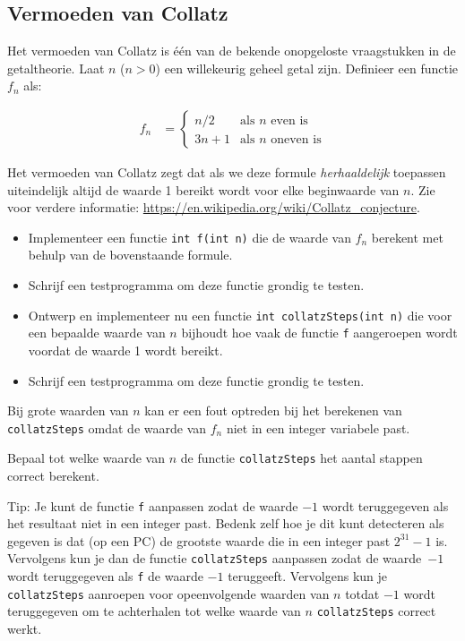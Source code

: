 \documentclass[a4paper,10pt,fleqn,twoside]{article}
\begin{document}
\subsection{Vermoeden van Collatz}
Het vermoeden van Collatz is één van de bekende onopgeloste vraagstukken in de getaltheorie.
Laat $n$ ($n>0$) een willekeurig geheel getal zijn. Definieer een functie $f_n$ als:

\begin{align*}
f_n &= \begin{cases}
n/2 &\text{als } n \text{ even is} \\
3n+1 &\text{als } n \text{ oneven is}
\end{cases}
\end{align*}

Het vermoeden van Collatz zegt dat als we deze formule \textsl{herhaaldelijk} toepassen uiteindelijk altijd de waarde 1 bereikt wordt voor elke beginwaarde van $n$. Zie voor verdere informatie: \url{https://en.wikipedia.org/wiki/Collatz_conjecture}. 

\begin{itemize}
\item Implementeer een functie \lstinline|int f(int n)| die de waarde van $f_n$ berekent met behulp van de bovenstaande formule.
\item Schrijf een testprogramma om deze functie grondig te testen.
\item Ontwerp en implementeer nu een functie \lstinline|int collatzSteps(int n)| die voor een bepaalde waarde van $n$ bijhoudt hoe vaak de functie \lstinline|f| aangeroepen wordt voordat de waarde 1 wordt bereikt.
\item Schrijf een testprogramma om deze functie grondig te testen.
\end{itemize}

Bij grote waarden van $n$ kan er een fout optreden bij het berekenen van \lstinline|collatzSteps| omdat de waarde van $f_n$ niet in een integer variabele past. 

Bepaal tot welke waarde van $n$ de functie \lstinline|collatzSteps| het aantal stappen correct berekent.

Tip: Je kunt de functie \lstinline|f| aanpassen zodat de waarde $-1$ wordt teruggegeven als het resultaat niet in een integer past. Bedenk zelf hoe je dit kunt detecteren als gegeven is dat (op een PC) de grootste waarde die in een integer past $2^{31}-1$ is. Vervolgens kun je dan de functie \lstinline|collatzSteps| aanpassen zodat de waarde~$-1$ wordt teruggegeven als \lstinline|f| de waarde $-1$ teruggeeft. Vervolgens kun je \lstinline|collatzSteps| aanroepen voor opeenvolgende waarden van $n$ totdat $-1$ wordt teruggegeven om te achterhalen tot welke waarde van $n$ \lstinline|collatzSteps| correct werkt.
\end{document}
